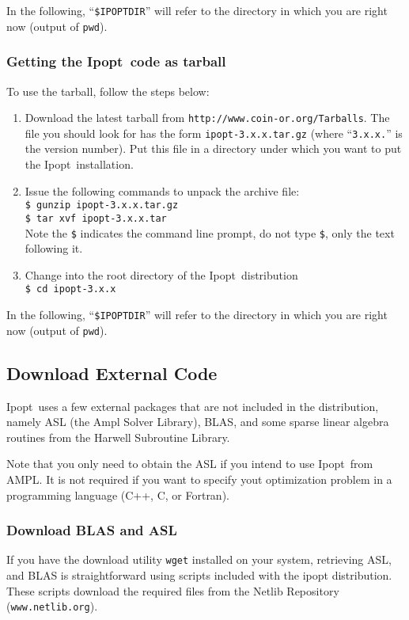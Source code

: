 \documentclass[letter,10pt]{article}
\newcommand{\Ipopt}{{\sc Ipopt}}
\begin{document}
In the following, ``\texttt{\$IPOPTDIR}'' will refer to the directory in
which you are right now (output of \texttt{pwd}).

\subsubsection{Getting the \Ipopt\ code as tarball}

To use the tarball, follow the steps below:
\begin{enumerate}
\item Download the latest tarball from
\texttt{http://www.coin-or.org/Tarballs}.  The file you should look
for has the form \texttt{ipopt-3.x.x.tar.gz} (where
``\texttt{3.x.x.}'' is the version number).  Put this file in a
directory under which you want to put the \Ipopt\ installation.
\item Issue the following commands to unpack the archive file: \\
\texttt{\$ gunzip ipopt-3.x.x.tar.gz} \\
\texttt{\$ tar xvf ipopt-3.x.x.tar} \\
Note the {\tt \$} indicates the command line
prompt, do not type {\tt \$}, only the text following it.
\item Change into the root directory of the \Ipopt\ distribution\\
{\tt \$ cd ipopt-3.x.x}
\end{enumerate}

In the following, ``\texttt{\$IPOPTDIR}'' will refer to the directory in
which you are right now (output of \texttt{pwd}).

\subsection{Download External Code}\label{ExternalCode}
\Ipopt\ uses a few external packages that are not included in the
distribution, namely ASL (the Ampl Solver Library), BLAS, and some
sparse linear algebra routines from the Harwell Subroutine Library.

Note that you only need to obtain the ASL if you intend to use \Ipopt\
from AMPL.  It is not required if you want to specify yout
optimization problem in a programming language (C++, C, or Fortran).

\subsubsection{Download BLAS and ASL}
If you have the download utility \texttt{wget} installed on your
system, retrieving ASL, and BLAS is straightforward using scripts
included with the ipopt distribution. These scripts download the
required files from the Netlib Repository (\texttt{www.netlib.org}).\\
\end{document}
